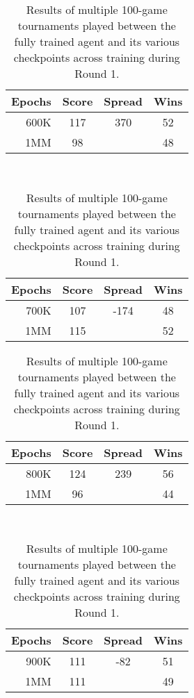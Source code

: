 \begin{table}
\begin{tabular}{|r|c|c|c|}
	\hline
	\textbf{Epochs} & \textbf{Score} & \textbf{Spread} & \textbf{Wins}
	\\\hline
	600K & 117 & 370 & 52
	\\\hline
	1MM & 98 & \textemdash & 48
	\\\hline
\end{tabular}
~
\begin{tabular}{|r|c|c|c|}
	\hline
	\textbf{Epochs} & \textbf{Score} & \textbf{Spread} & \textbf{Wins}
	\\\hline
	700K & 107 & -174 & 48
	\\\hline
	1MM & 115 & \textemdash & 52
	\\\hline
\end{tabular}

\begin{tabular}{|r|c|c|c|}
	\hline
	\textbf{Epochs} & \textbf{Score} & \textbf{Spread} & \textbf{Wins}
	\\\hline
	800K & 124 & 239 & 56
	\\\hline
	1MM & 96 & \textemdash & 44
	\\\hline
\end{tabular}
~
\begin{tabular}{|r|c|c|c|}
	\hline
	\textbf{Epochs} & \textbf{Score} & \textbf{Spread} & \textbf{Wins}
	\\\hline
	900K & 111 & -82 & 51
	\\\hline
	1MM & 111 & \textemdash & 49
	\\\hline
\end{tabular}


\caption{
	Results of multiple 100-game tournaments played between
	the fully trained agent
	and its various checkpoints
	across training during Round 1.
}

\label{tab_r1-selftourny}

\end{table}

